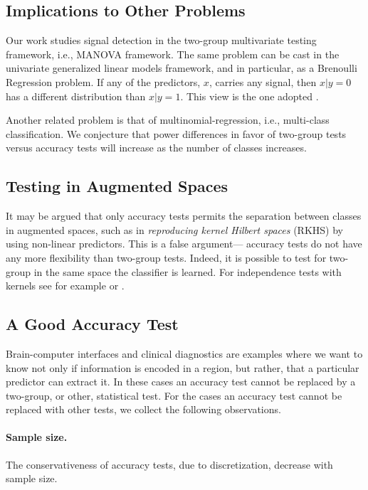 \documentclass[journal]{IEEEtran}
\begin{document}
\subsection{Implications to Other Problems}

Our work studies signal detection in the two-group multivariate testing framework, i.e., MANOVA framework.
The same problem can be cast in the univariate generalized linear models framework, and in particular, as a Brenoulli Regression problem.
If any of the predictors, $x$, carries any signal, then $x|y=0$ has a different distribution than $x|y=1$.
This view is the one adopted \cite{goeman2006testing}.

Another related problem is that of multinomial-regression, i.e., multi-class classification.
We conjecture that power differences in favor of two-group tests versus accuracy tests will increase as the number of classes increases.




\subsection{Testing in Augmented Spaces}
It may be argued that only accuracy tests permits the separation between classes in augmented spaces, such as in \emph{reproducing kernel Hilbert spaces} (RKHS) by using non-linear predictors. 
This is a false argument--- accuracy tests do not have any more flexibility than two-group tests. 
Indeed, it is possible to test for two-group in the same space the classifier is learned. 
For independence tests  with kernels see for example \cite{szekely_brownian_2009} or \cite{gretton_kernel_2012-1}.



\subsection{A Good Accuracy Test}
Brain-computer interfaces and clinical diagnostics \cite{olivetti_induction_2012,wager_fmri-based_2013} are examples where we want to know not only if information is encoded in a region, but rather, that a particular predictor can extract it. 
In these cases an accuracy test cannot be replaced by a two-group, or other, statistical test. 
For the cases an accuracy test cannot be replaced with other tests, we collect the following observations.

\paragraph{Sample size.} The conservativeness of accuracy tests, due to discretization, decrease with sample size. 
\end{document}
